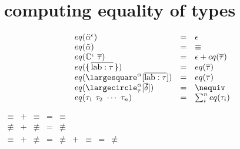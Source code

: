 \documentclass[11pt,a4paper]{article}
\newcommand{\nbkey}[1]{\textrm{#1}}
\newcommand{\record}[1]{\{\!\!\shortmid #1 \shortmid\!\!\}}
\newcommand{\overld}[3]{\largecircle^{#1}_{#2}{#3}}
\newcommand{\irecrd}[2]{\largesquare^{#1}{#2}}
\newcommand{\lab}{\nbkey{lab}}
\newcommand{\rigdvar}[1]{\ddot{#1}}
\newcommand{\flexvar}[1]{\tilde#1}
\newcommand{\tycon}{\mathbb{C}}
\newcommand{\type}{\tau}
\newcommand{\scheme}{\delta}
\newcommand{\equality}{\epsilon}
\newcommand{\eqyes}{\equiv}
\newcommand{\eqnot}{\nequiv}
\begin{document}
\section {computing equality of types}
\begin{minipage}{0.7\textwidth}
\[\begin{array}{lcl}
eq(\rigdvar{\alpha}^\equality) 						&=& \equality \\
eq(\flexvar{\alpha})                                &=& \eqyes    \\
eq(\tycon^\equality\ \overline\type) 				&=& \equality + eq(\overline\type) \\
eq(\record{\overline{\lab:\type}})			        &=& eq(\overline\type)    \\
eq(\irecrd{\alpha}{[\overline{\lab:\type}]})	    &=& eq(\overline\type)    \\
eq(\overld{\alpha}{\type}{[\overline\scheme]})		&=& \eqnot                \\
eq(\type_1\ \type_2\ \cdots\ \type_n)			    &=& \sum_i^n eq(\type_i)  \\
\end{array}\]
\end{minipage}
\begin{minipage}{0.3\textwidth}
$\begin{array}{ccccccccl}
\eqyes &+& \eqyes &=& \eqyes \\
\eqnot &+& \eqnot &=& \eqnot \\
\eqyes &+& \eqnot &=& \eqnot &+& \eqyes &=& \eqnot \\
\\
\end{array}$
\end{minipage}
\end{document}
